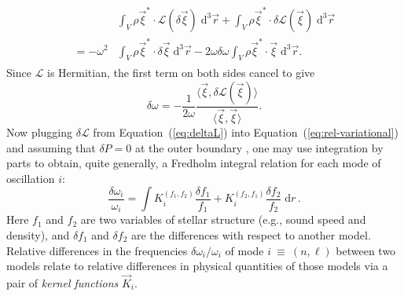{\begin{align}
\begin{split}
    &\int_V \rho \vec\xi^\ast \cdot  \mathcal{L}(\delta\vec\xi) \; \text{d}^3\vec r
    +
    \int_V \rho \vec\xi^\ast \cdot  \delta\mathcal{L}(\vec\xi) \; \text{d}^3\vec r
    \\= -\omega^2&\int_V \rho \vec\xi^\ast \cdot  \delta\vec\xi \; \text{d}^3\vec r
    -2\omega\delta\omega\int_V \rho \vec\xi^\ast \cdot  \vec\xi \; \text{d}^3\vec r.
\end{split}
\end{align}
Since $\mathcal{L}$ is Hermitian, the first term on both sides cancel to give
\begin{equation} \label{eq:rel-variational}
    \delta\omega
    =
    -\frac{1}{2\omega}\frac{\langle \vec\xi, \delta \mathcal{L}(\vec\xi) \rangle}{\langle \vec\xi, \vec\xi \rangle}.
\end{equation}
Now plugging $\delta\mathcal{L}$ from Equation~(\ref{eq:deltaL}) into Equation~(\ref{eq:rel-variational}) and assuming that $\delta P=0$ at the outer boundary \citep[e.g.,][]{1967MNRAS.136..293L}, one may use integration by parts to obtain, quite generally, a Fredholm integral relation for each mode of oscillation $i$:
\begin{equation} \label{eq:forward} \boxed{
  \frac{\delta\omega_i}{\omega_i} 
  = 
  \int K_i^{(f_1, f_2)} \frac{\delta f_1}{f_1}
                + K_i^{(f_2, f_1)} \frac{\delta f_2}{f_2}
       \;\text{d}r
}\,. \end{equation}}
Here $f_1$ and $f_2$ are two variables of stellar structure (e.g., sound speed and density), and
${\delta f_1}$ and ${\delta f_2}$ are the differences with respect to another model. %
Relative differences in the frequencies ${\delta\omega_i/\omega_i}$ of mode ${i~\equiv~(n,\ell)}$ between two models relate to relative differences in physical quantities of those models via a pair of \emph{kernel functions} $\vec{K}_i$. 

